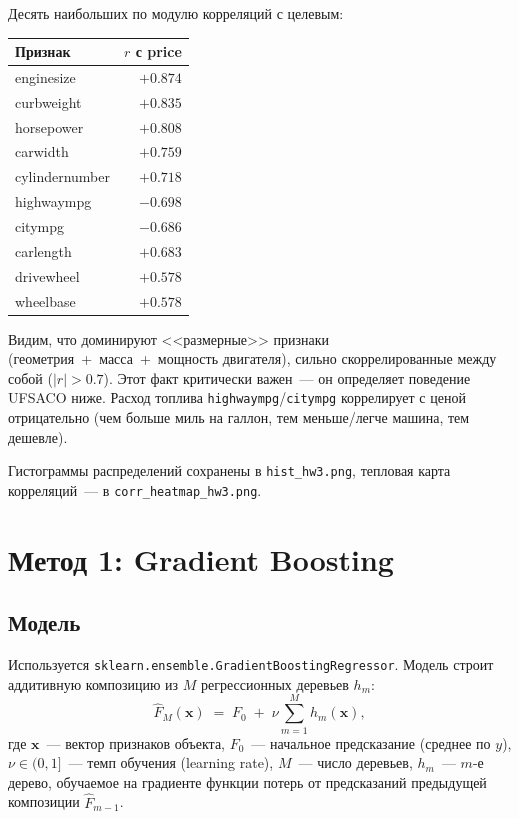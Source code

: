\documentclass[12pt,a4paper]{article}
\begin{document}
Десять наибольших по модулю корреляций с целевым:

\begin{center}
\begin{tabular}{lr}
\toprule
\textbf{Признак} & \textbf{$r$ с price} \\
\midrule
enginesize        & $+0.874$ \\
curbweight        & $+0.835$ \\
horsepower        & $+0.808$ \\
carwidth          & $+0.759$ \\
cylindernumber    & $+0.718$ \\
highwaympg        & $-0.698$ \\
citympg           & $-0.686$ \\
carlength         & $+0.683$ \\
drivewheel        & $+0.578$ \\
wheelbase         & $+0.578$ \\
\bottomrule
\end{tabular}
\end{center}

Видим, что доминируют <<размерные>> признаки (геометрия~+~масса~+~мощность
двигателя), сильно скоррелированные между собой ($|r| > 0.7$). Этот
факт критически важен~--- он определяет поведение UFSACO ниже.
Расход топлива \texttt{highwaympg}/\texttt{citympg} коррелирует с ценой
отрицательно (чем больше миль на галлон, тем меньше/легче машина, тем
дешевле).

Гистограммы распределений сохранены в \texttt{hist\_hw3.png},
тепловая карта корреляций~--- в \texttt{corr\_heatmap\_hw3.png}.

\section{Метод 1: Gradient Boosting}

\subsection{Модель}
Используется \texttt{sklearn.ensemble.GradientBoostingRegressor}.
Модель строит аддитивную композицию из $M$ регрессионных деревьев $h_m$:
\begin{equation}
  \hat{F}_M(\mathbf{x}) \;=\; F_0 \;+\; \nu \sum_{m=1}^{M} h_m(\mathbf{x}),
  \label{eq:gb}
\end{equation}
где $\mathbf{x}$~--- вектор признаков объекта,
$F_0$~--- начальное предсказание (среднее по $y$),
$\nu \in (0,1]$~--- темп обучения (learning rate),
$M$~--- число деревьев,
$h_m$~--- $m$-е дерево, обучаемое на градиенте функции потерь от
предсказаний предыдущей композиции $\hat{F}_{m-1}$.
\end{document}
